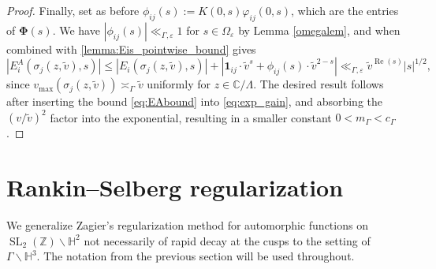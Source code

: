 \documentclass[12pt,reqno]{amsart}
\numberwithin{equation}{section}
\renewcommand{\Re}{\operatorname{Re}}
\begin{document}
\begin{proof}
    Finally, set as before $\phi_{ij}(s) := K(0, s) \varphi_{ij}(0, s)$, which are the entries of $\mathbf{\Phi}(s)$. We have $|{\phi_{ij}(s)}| \ll_{\Gamma, \varepsilon} 1$ 
    for $s \in \Omega_{\varepsilon}$ by Lemma \ref{omegalem}, and when combined with \cref{lemma:Eis_pointwise_bound} gives
    \begin{equation} \label{eq:EAbound}
        |{E_i^A(\sigma_j (z, \widetilde{v}), s)}| \leq |{E_i(\sigma_j (z, \widetilde{v}), s)}| + |{\mathbf{1}_{i j} \cdot \widetilde{v}^s+ \phi_{i j}(s) \cdot \widetilde{v}^{2-s}}|\ll_{\Gamma, \varepsilon} \widetilde{v}^{\Re(s)} |{s}|^{1/2},
    \end{equation}
    since $v_{\text{max}}(\sigma_j(z,\widetilde{v})) \asymp_{\Gamma} \widetilde{v}$ uniformly for $z \in \mathbb{C} / \Lambda$.
    The desired result follows after inserting the bound \eqref{eq:EAbound} into \eqref{eq:exp_gain}, and absorbing the $(v/\widetilde{v})^2$ factor into the exponential,
    resulting in a smaller constant $0<m_{\Gamma}<c_{\Gamma}$.
\end{proof}


\section{Rankin--Selberg regularization} \label{zagregsec}

We generalize Zagier's regularization method \cite{Zag} for automorphic functions on $\operatorname{SL}_2(\mathbb{Z}) \backslash \mathbb{H}^2$ not necessarily of rapid decay at the cusps to the setting of $\Gamma \backslash \mathbb{H}^3$. The notation from the previous section will be used throughout. 
\end{document}

